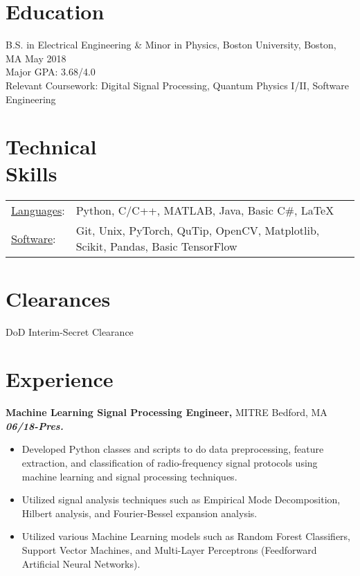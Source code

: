 \documentclass[margin]{res}
\begin{document}
\begin{resume} 
 

\section{Education} 
B.S. in Electrical Engineering \& Minor in Physics, Boston University, Boston, MA \hfill May 2018 \\
Major GPA: 3.68/4.0 \\
Relevant Coursework: Digital Signal Processing, Quantum Physics I/II, Software Engineering



\section{Technical \\ Skills}
   \begin{tabular}{l p{5.0in}}
     \underline{Languages}: & Python, C/C++, MATLAB, Java, Basic C\#, LaTeX \\ 
     \underline{Software}: & Git, Unix, PyTorch, QuTip, OpenCV, Matplotlib, Scikit, Pandas, Basic TensorFlow
 \end{tabular}





 
\section{Clearances}
DoD Interim-Secret Clearance 

\section{Experience}
{\bf Machine Learning Signal Processing Engineer,} MITRE Bedford, MA \hfill \textbf{\textit{06/18-Pres.}}
\begin{itemize}  pt
    \item Developed Python classes and scripts to do data preprocessing, feature extraction, and classification of radio-frequency signal protocols using machine learning and signal processing techniques.
    \item Utilized signal analysis techniques such as Empirical Mode Decomposition, Hilbert analysis, and Fourier-Bessel expansion analysis.
    \item Utilized various Machine Learning models such as Random Forest Classifiers, Support Vector Machines, and Multi-Layer Perceptrons (Feedforward Artificial Neural Networks).
\end{itemize}








\end{resume}
\end{document}
